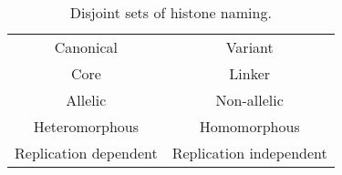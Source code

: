   \begin{table}
    \caption{Disjoint sets of histone naming.}
    \label{tab:histone-disjoint-sets}
    \centering
    \begin{tabular}{c@{ and }c}
      \toprule
      Canonical & Variant \\
      Core & Linker \\
      Allelic & Non-allelic \\
      Heteromorphous & Homomorphous \\
      Replication dependent & Replication independent \\
      \bottomrule
    \end{tabular}
  \end{table}
